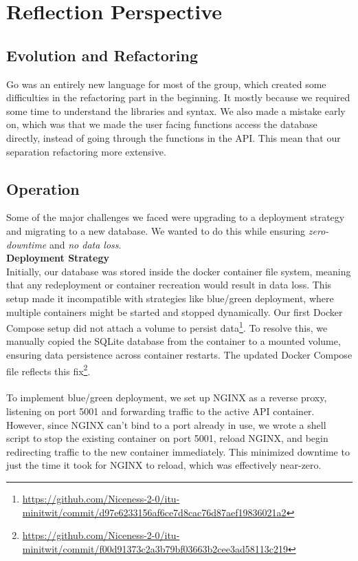 \section{Reflection Perspective}
\subsection{Evolution and Refactoring}

Go was an entirely new language for most of the group, which created some difficulties in the refactoring part in the beginning. It mostly because we required some time to understand the libraries and syntax. 
We also made a mistake early on, which was that we made the user facing functions access the database directly, instead of going through the functions in the API. This mean that our separation refactoring more extensive.


\subsection{Operation}
Some of the major challenges we faced were upgrading to a deployment strategy and migrating to a new database. We wanted to do this while ensuring \textit{zero-downtime} and \textit{no data loss}.
\\

\noindent \textbf{Deployment Strategy}
\\

Initially, our database was stored inside the docker container file system, meaning that any redeployment or container recreation would result in data loss. This setup made it incompatible with strategies like blue/green deployment, where multiple containers might be started and stopped dynamically. Our first Docker Compose setup did not attach a volume to persist data\footnote{\url{https://github.com/Niceness-2-0/itu-minitwit/commit/d97e6233156af6ce7d8cac76d87aef19836021a2}}. To resolve this, we manually copied the SQLite database from the container to a mounted volume, ensuring data persistence across container restarts. The updated Docker Compose file reflects this fix\footnote{\url{https://github.com/Niceness-2-0/itu-minitwit/commit/f00d91373c2a3b79bf03663b2cee3ad58113c219}}.
\\
\\

To implement blue/green deployment, we set up NGINX as a reverse proxy, listening on port 5001 and forwarding traffic to the active API container. However, since NGINX can't bind to a port already in use, we wrote a shell script to stop the existing container on port 5001, reload NGINX, and begin redirecting traffic to the new container immediately. This minimized downtime to just the time it took for NGINX to reload, which was effectively near-zero.
\\

